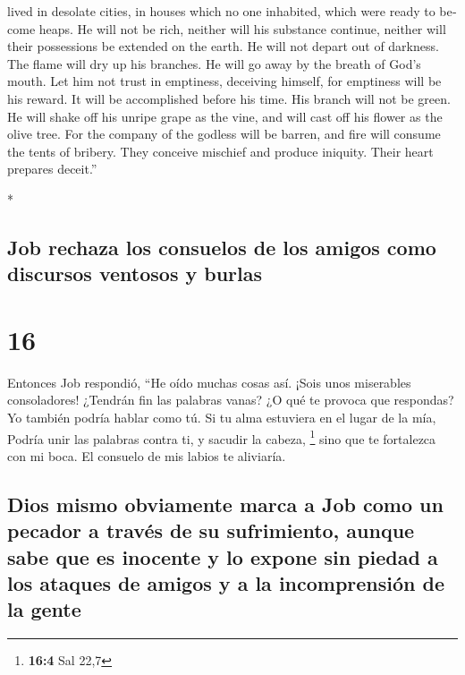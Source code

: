 \begin{paracol}{2}
\begin{otherlanguage}{english}
lived in desolate cities, in houses which no one inhabited, which were
ready to become heaps.  He will not be rich, neither will
his substance continue, neither will their possessions be extended on
the earth.  He will not depart out of darkness. The flame
will dry up his branches. He will go away by the breath of God's mouth.
 Let him not trust in emptiness, deceiving himself, for
emptiness will be his reward.  It will be accomplished
before his time. His branch will not be green.  He will
shake off his unripe grape as the vine, and will cast off his flower as
the olive tree.  For the company of the godless will be
barren, and fire will consume the tents of bribery.  They
conceive mischief and produce iniquity. Their heart prepares deceit.''

\end{otherlanguage}

\switchcolumn[0]*

\hypertarget{job-rechaza-los-consuelos-de-los-amigos-como-discursos-ventosos-y-burlas}{%
\subsection{Job rechaza los consuelos de los amigos como discursos
ventosos y
burlas}\label{job-rechaza-los-consuelos-de-los-amigos-como-discursos-ventosos-y-burlas}}

\hypertarget{section-30}{%
\section{16}\label{section-30}}

 Entonces Job respondió,  ``He oído muchas
cosas así. ¡Sois unos miserables consoladores!  ¿Tendrán
fin las palabras vanas? ¿O qué te provoca que respondas? 
Yo también podría hablar como tú. Si tu alma estuviera en el lugar de la
mía, Podría unir las palabras contra ti, y sacudir la cabeza,
\footnote{\textbf{16:4} Sal 22,7}  sino que te fortalezca
con mi boca. El consuelo de mis labios te aliviaría.

\hypertarget{dios-mismo-obviamente-marca-a-job-como-un-pecador-a-travuxe9s-de-su-sufrimiento-aunque-sabe-que-es-inocente-y-lo-expone-sin-piedad-a-los-ataques-de-amigos-y-a-la-incomprensiuxf3n-de-la-gente}{%
\subsection{Dios mismo obviamente marca a Job como un pecador a través
de su sufrimiento, aunque sabe que es inocente y lo expone sin piedad a
los ataques de amigos y a la incomprensión de la
gente}\label{dios-mismo-obviamente-marca-a-job-como-un-pecador-a-travuxe9s-de-su-sufrimiento-aunque-sabe-que-es-inocente-y-lo-expone-sin-piedad-a-los-ataques-de-amigos-y-a-la-incomprensiuxf3n-de-la-gente}}


\end{paracol}
